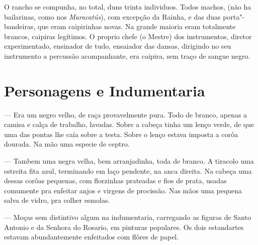 O rancho se compunha, no total, duns trinta individuos. Todos machos,
(não ha bailarinas, como nos \emph{Maracatús}), com excepção da Rainha,
e das duas porta"-bandeiras, que eram caipirinhas novas. Na grande
maioria eram totalmente brancos, caipiras legítimos. O proprio chefe (o
Mestre) dos instrumentos, diretor experimentado, ensinador de tudo,
ensaiador das dansas, dirigindo no seu instrumento a percussão
acompanhante, era caipira, sem traço de sangue negro.

\section*{Personagens e Indumentaria}

 --- Era um negro velho, de raça provavelmente pura. Todo de
branco, apenas a camisa e calça de trabalho, lavadas. Sobre a cabeça
tinha um lenço verde, de que uma das pontas lhe caía sobre a testa.
Sobre o lenço estava imposta a corôa dourada. Na mão uma especie de
ceptro.

 --- Tambem uma negra velha, bem arranjadinha, toda de
branco. A tiracolo uma estreita fita azul, terminando em laço pendente,
na anca direita. Na cabeça uma dessas corôas pequenas, com florzinhas
prateadas e fios de prata, usadas comumente pra enfeitar anjos e virgens
de procissão. Nas mãos uma pequena salva de vidro, pra colher esmolas.

 --- Moças sem distintivo algum na
indumentaria, carregando as figuras de Santo Antonio e da Senhora do
Rosario, em pinturas populares. Os dois estandartes estavam
abundantemente enfeitados com flôres de papel.

